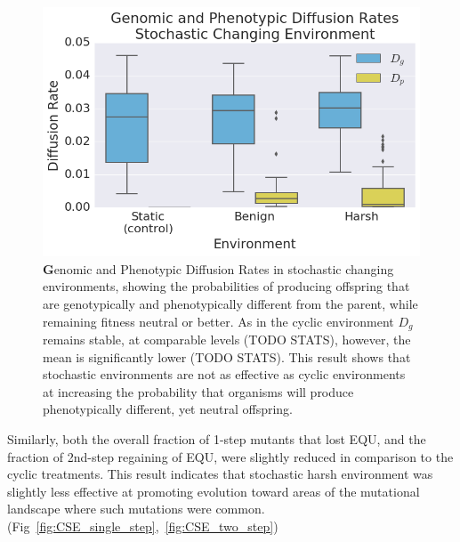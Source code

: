 \documentclass[PhD]{msu-thesis}
\begin{document}
\begin{figure}[!h] %
\includegraphics[trim={0.2cm 0 0.4cm 0.25cm},clip,width=0.75\columnwidth]{figures/CE/CSE_D_g_D_p__box.png}
\caption{{\textbf Genomic and Phenotypic Diffusion Rates} in stochastic changing environments, showing the probabilities of producing offspring that are genotypically and phenotypically different from the parent, while remaining fitness neutral or better. As in the cyclic environment $D_g$ remains stable, at comparable levels (TODO STATS), however, the mean is significantly lower (TODO STATS). This result shows that stochastic environments are not as effective as cyclic environments at increasing the probability that organisms will produce phenotypically different, yet neutral offspring.
}\label{fig:CSE_diffusion_rate}
\end{figure}

Similarly, both the overall fraction of 1-step mutants that lost EQU, and the fraction of 2nd-step regaining of EQU, were slightly reduced in comparison to the cyclic treatments. This result indicates that stochastic harsh environment was slightly less effective at promoting evolution toward areas of the mutational landscape where such mutations were common.
(Fig~\ref{fig:CSE_single_step},~\ref{fig:CSE_two_step})
\end{document}

